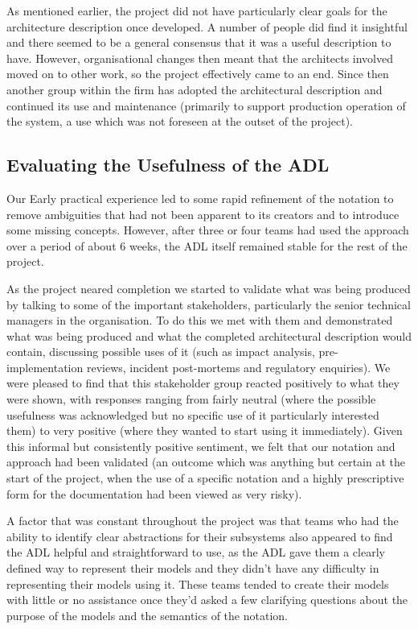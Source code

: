   As mentioned earlier, the project did not have particularly clear goals for the architecture description once developed.  A number of people did find it insightful and there seemed to be a general consensus that it was a useful description to have.  However, organisational changes then meant that the architects involved moved on to other work, so the project effectively came to an end.  Since then another group within the firm has adopted the architectural description and continued its use and maintenance (primarily to support production operation of the system, a use which was not foreseen at the outset of the project).

\subsection{Evaluating the Usefulness of the ADL}

 Our Early practical experience led to some rapid refinement of the notation to remove ambiguities that had not been apparent to its creators and to introduce some missing concepts.  However, after three or four teams had used the approach over a period of about 6 weeks, the ADL itself remained stable for the rest of the project.

  As the project neared completion we started to validate what was being produced by talking to some of the important stakeholders, particularly the senior technical managers in the organisation.  To do this we met with them and demonstrated what was being produced and what the completed architectural description would contain, discussing possible uses of it (such as impact analysis, pre-implementation reviews, incident post-mortems and regulatory enquiries).  We were pleased to find that this stakeholder group reacted positively to what they were shown, with responses ranging from fairly neutral (where the possible usefulness was acknowledged but no specific use of it particularly interested them) to very positive (where they wanted to start using it immediately).  Given this informal but consistently positive sentiment, we felt that our notation and approach had been validated (an outcome which was anything but certain at the start of the project, when the use of a specific notation and a highly prescriptive form for the documentation had been viewed as very risky). 

  A factor that was constant throughout the project was that teams who had the ability to identify clear abstractions for their subsystems also appeared to find the ADL helpful and straightforward to use, as the ADL gave them a clearly defined way to represent their models and they didn't have any difficulty in representing their models using it.  These teams tended to create their models with little or no assistance once they'd asked a few clarifying questions about the purpose of the models and the semantics of the notation.


